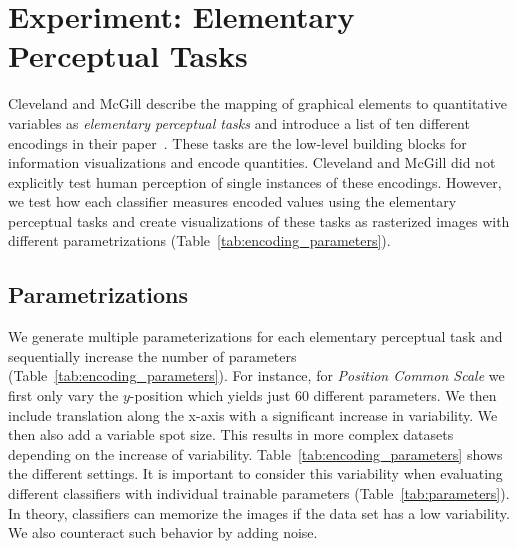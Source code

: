 \section{Experiment: Elementary Perceptual Tasks}

Cleveland and McGill describe the mapping of graphical elements to quantitative variables as \emph{elementary perceptual tasks} and introduce a list of ten different encodings in their paper~\cite{cleveland_mcgill,cleveland1985graphical}. These tasks are the low-level building blocks for information visualizations and encode quantities. Cleveland and McGill did not explicitly test human perception of single instances of these encodings. However, we test how each classifier measures encoded values using the elementary perceptual tasks and create visualizations of these tasks as rasterized images with different parametrizations (Table~\ref{tab:encoding_parameters}).

\subsection{Parametrizations}
\label{sec:parametrizations}
We generate multiple parameterizations for each elementary perceptual task and sequentially increase the number of parameters (Table~\ref{tab:encoding_parameters}). For instance, for \emph{Position Common Scale} we first only vary the $y$-position which yields just $60$ different parameters. We then include translation along the x-axis with a significant increase in variability. We then also add a variable spot size. This results in more complex datasets depending on the increase of variability. Table~\ref{tab:encoding_parameters} shows the different settings. It is important to consider this variability when evaluating different classifiers with individual trainable parameters (Table~\ref{tab:parameters}). In theory, classifiers can memorize the images if the data set has a low variability. We also counteract such behavior by adding noise.




